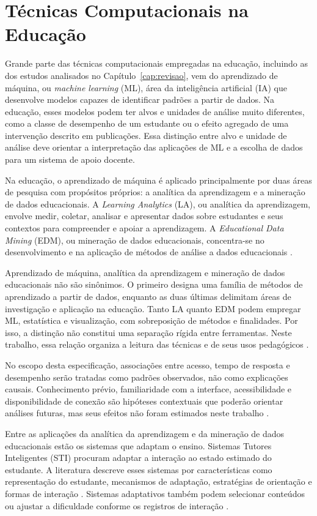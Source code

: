 \section{Técnicas Computacionais na Educação}
\label{sec:fund-tecnicas}

Grande parte das técnicas computacionais empregadas na educação, incluindo as dos estudos analisados no Capítulo~\ref{cap:revisao}, vem do aprendizado de máquina, ou \textit{machine learning} (ML), área da inteligência artificial (IA) que desenvolve modelos capazes de identificar padrões a partir de dados. Na educação, esses modelos podem ter alvos e unidades de análise muito diferentes, como a classe de desempenho de um estudante ou o efeito agregado de uma intervenção descrito em publicações. Essa distinção entre alvo e unidade de análise deve orientar a interpretação das aplicações de ML e a escolha de dados para um sistema de apoio docente.

Na educação, o aprendizado de máquina é aplicado principalmente por duas áreas de pesquisa com propósitos próprios: a analítica da aprendizagem e a mineração de dados educacionais. A \textit{Learning Analytics} (LA), ou analítica da aprendizagem, envolve medir, coletar, analisar e apresentar dados sobre estudantes e seus contextos para compreender e apoiar a aprendizagem. A \textit{Educational Data Mining} (EDM), ou mineração de dados educacionais, concentra-se no desenvolvimento e na aplicação de métodos de análise a dados educacionais \cite{Romero2020}.

Aprendizado de máquina, analítica da aprendizagem e mineração de dados educacionais não são sinônimos. O primeiro designa uma família de métodos de aprendizado a partir de dados, enquanto as duas últimas delimitam áreas de investigação e aplicação na educação. Tanto LA quanto EDM podem empregar ML, estatística e visualização, com sobreposição de métodos e finalidades. Por isso, a distinção não constitui uma separação rígida entre ferramentas. Neste trabalho, essa relação organiza a leitura das técnicas e de seus usos pedagógicos \cite{Romero2020}.

No escopo desta especificação, associações entre acesso, tempo de resposta e desempenho serão tratadas como padrões observados, não como explicações causais. Conhecimento prévio, familiaridade com a interface, acessibilidade e disponibilidade de conexão são hipóteses contextuais que poderão orientar análises futuras, mas seus efeitos não foram estimados neste trabalho \cite{NRC2001}.

Entre as aplicações da analítica da aprendizagem e da mineração de dados educacionais estão os sistemas que adaptam o ensino. Sistemas Tutores Inteligentes (STI) procuram adaptar a interação ao estado estimado do estudante. A literatura descreve esses sistemas por características como representação do estudante, mecanismos de adaptação, estratégias de orientação e formas de interação \cite{Mousavinasab2021}. Sistemas adaptativos também podem selecionar conteúdos ou ajustar a dificuldade conforme os registros de interação \cite{Xie2019}.

